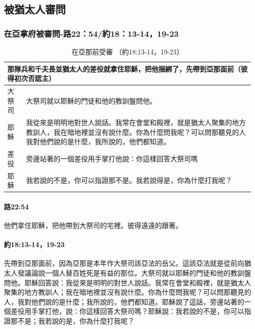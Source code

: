 \subsection{被猶太人審問}
\subsubsection{在亞拿府被審問-路22：54/約18：13-14，19-23}

\begin{table}[htbp]
  \centering 
    \begin{tabular}{|p{3em}|p{39em}|}
    \toprule
    \multicolumn{2}{|p{42em}|}{\textcolor[rgb]{ 0,  .075,  .125}{那隊兵和千夫長並猶太人的差役就拿住耶穌，把他捆綁了，先帶到亞那面前（彼得初次否認主）}} \\
    \midrule
    \textcolor[rgb]{ 0,  .075,  .125}{大祭司} & \textcolor[rgb]{ 0,  .075,  .125}{大祭司就以耶穌的門徒和他的教訓盤問他。} \\
    \midrule
    \textcolor[rgb]{ 0,  .075,  .125}{耶穌} & 我從來是明明地對世人說話。我常在會堂和殿裡，就是猶太人聚集的地方教訓人，我在暗地裡並沒有說什麼。你為什麼問我呢？可以問那聽見的人我對他們說的是什麼，我所說的，他們都知道。 \\
    \midrule
    \textcolor[rgb]{ 0,  .075,  .125}{差役} & 旁邊站著的一個差役用手掌打他說：你這樣回答大祭司嗎 \\
    \midrule
    \textcolor[rgb]{ 0,  .075,  .125}{耶穌} & 我若說的不是，你可以指證那不是。我若說得是，你為什麼打我呢？ \\
    \bottomrule
    \end{tabular}%
     \caption{在亞那前受審 （約18:13-14，19-23）}
  \label{tab:addlabel}%
\end{table}


\paragraph{路22:54}
他們拿住耶穌，把他帶到大祭司的宅裡。彼得遠遠的跟著。

\paragraph{約18:13-14，19-23}
先帶到亞那面前，因為亞那是本年作大祭司該亞法的岳父。這該亞法就是從前向猶太人發議論說一個人替百姓死是有益的那位。大祭司就以耶穌的門徒和他的教訓盤問他。耶穌回答說：我從來是明明的對世人說話。我常在會堂和殿裡，就是猶太人聚集的地方教訓人；我在暗地裡並沒有說什麼。你為什麼問我呢？可以問那聽見的人，我對他們說的是什麼；我所說的，他們都知道。耶穌說了這話，旁邊站著的一個差役用手掌打他，說：你這樣回答大祭司嗎？耶穌說：我若說的不是，你可以指證那不是；我若說的是，你為什麼打我呢？

